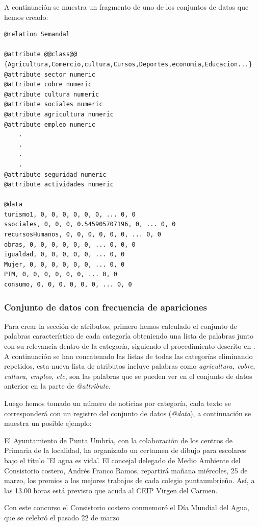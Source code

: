 A continuación se muestra un fragmento de uno de los conjuntos de datos que hemos creado:
\begin{lstlisting}
@relation Semandal

@attribute @@class@@ {Agricultura,Comercio,cultura,Cursos,Deportes,economia,Educacion...}
@attribute sector numeric
@attribute cobre numeric
@attribute cultura numeric
@attribute sociales numeric
@attribute agricultura numeric
@attribute empleo numeric
	.
	.
	.
	.		
@attribute seguridad numeric
@attribute actividades numeric

@data
turismo1, 0, 0, 0, 0, 0, 0, ... 0, 0
ssociales, 0, 0, 0, 0.545905707196, 0, ... 0, 0
recursosHumanos, 0, 0, 0, 0, 0, 0, ... 0, 0
obras, 0, 0, 0, 0, 0, 0, ... 0, 0, 0
igualdad, 0, 0, 0, 0, 0, ... 0, 0
Mujer, 0, 0, 0, 0, 0, 0, ... 0, 0
PIM, 0, 0, 0, 0, 0, 0, ... 0, 0
consumo, 0, 0, 0, 0, 0, 0, ... 0, 0
\end{lstlisting}
\subsubsection{Conjunto de datos con frecuencia de apariciones}

Para crear la sección de atributos, primero hemos calculado el conjunto de palabras característico de cada categoría obteniendo una lista de palabras junto con su relevancia dentro de la categoría, siguiendo el procedimiento descrito en . A continuación se han concatenado las listas de todas las categorías eliminando repetidos, esta nueva lista de atributos incluye palabras como \textit{agricultura, cobre, cultura, empleo, etc}, son las palabras que se pueden ver en el conjunto de datos anterior en la parte de \textit{@attribute}.

Luego hemos tomado un número de noticias por categoría, cada texto se corresponderá con un registro del conjunto de datos (\textit{@data}), a continuación se muestra un posible ejemplo:


\glqq El Ayuntamiento de Punta Umbría, con la colaboración de los centros de Primaria de la localidad, ha organizado un certamen de dibujo para escolares bajo el título 'El agua es vida'. El concejal delegado de Medio Ambiente del Consistorio costero, Andrés Franco Ramos, repartirá mañana miércoles, 25 de marzo, los premios a los mejores trabajos de cada colegio puntaumbrieño. Así, a las 13.00 horas está previsto que acuda al CEIP Virgen del Carmen.

Con este concurso el Consistorio costero conmemoró el Día Mundial del Agua, que se celebró el pasado 22 de marzo \grqq

